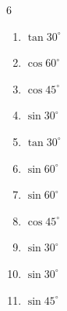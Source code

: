 


\setcounter{quesnum}{90}

\begin{multicols}{6}
\begin{enumerate}
  \itemsep=7pt
  \item $\displaystyle \tan{30^\circ}$


  \item $\displaystyle \cos{60^\circ}$


  \item $\displaystyle \cos{45^\circ}$


  \item $\displaystyle \sin{30^\circ}$


  \item $\displaystyle \tan{30^\circ}$


  \item $\displaystyle \sin{60^\circ}$


  \item $\displaystyle \sin{60^\circ}$


  \item $\displaystyle \cos{45^\circ}$


  \item $\displaystyle \sin{30^\circ}$


  \item $\displaystyle \sin{30^\circ}$


  \item $\displaystyle \sin{45^\circ}$



\end{enumerate}
\end{multicols}
